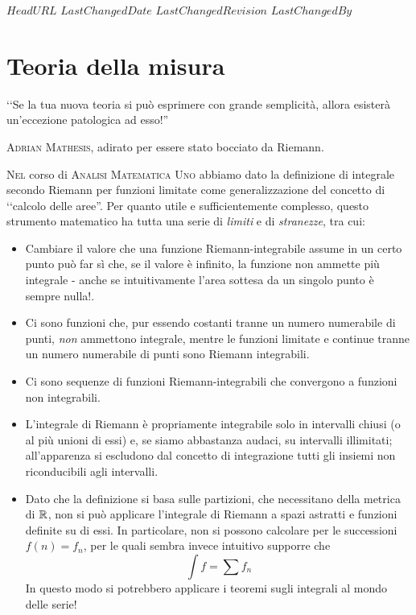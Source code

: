 \svnidlong
{$HeadURL$}
{$LastChangedDate$}
{$LastChangedRevision$}
{$LastChangedBy$}

\chapter{Teoria della misura}

\begin{introduction}
	‘‘Se la tua nuova teoria si può esprimere con grande semplicità, allora esisterà un'eccezione patologica ad esso!''
\begin{flushright}
	\textsc{Adrian Mathesis,} adirato per essere stato bocciato da Riemann.
\end{flushright}
\end{introduction}
\lettrine[findent=1pt, nindent=0pt]{N}{el} corso di \textsc{Analisi Matematica Uno} abbiamo dato la definizione di integrale secondo Riemann per funzioni limitate come generalizzazione del concetto di ‘‘calcolo delle aree''. Per quanto utile e sufficientemente complesso, questo strumento matematico ha tutta una serie di \textit{limiti} e di \textit{stranezze}, tra cui:
\begin{itemize}
	\item Cambiare il valore che una funzione Riemann-integrabile assume in un certo punto può far sì che, se il valore è infinito, la funzione non ammette più integrale - anche se intuitivamente l'area sottesa da un singolo punto è sempre nulla!.
	\item Ci sono funzioni che, pur essendo costanti tranne un numero numerabile di punti, \textit{non} ammettono integrale, mentre le funzioni limitate e continue tranne un numero numerabile di punti sono Riemann integrabili.
	\item Ci sono sequenze di funzioni Riemann-integrabili che convergono a funzioni non integrabili.
	\item L'integrale di Riemann è propriamente integrabile solo in intervalli chiusi (o al più unioni di essi) e, se siamo abbastanza audaci, su intervalli illimitati; all'apparenza si escludono dal concetto di integrazione tutti gli insiemi non riconducibili agli intervalli.
	\item Dato che la definizione si basa sulle partizioni, che necessitano della metrica di $\mathbb{R}$, non si può applicare l'integrale di Riemann a spazi astratti e funzioni definite su di essi. In particolare, non si possono calcolare per le successioni $f(n)=f_n$, per le quali sembra invece intuitivo supporre che
	\begin{equation*}
		\int f=\sum f_n
	\end{equation*}
	In questo modo si potrebbero applicare i teoremi sugli integrali al mondo delle serie! 
\end{itemize}
